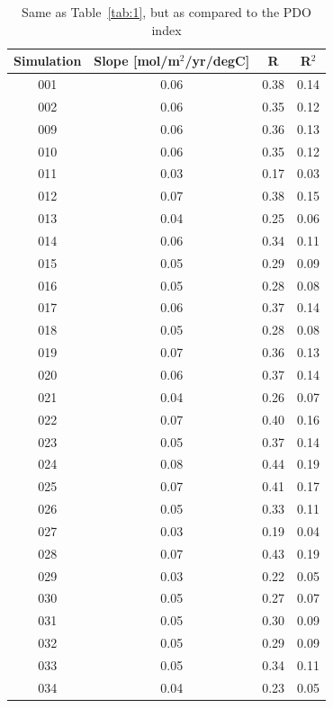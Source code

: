 \documentclass[12pt]{article}
\begin{document}
\begin{table}[!h]
\centering
\caption{Same as Table~\ref{tab:1}, but as compared to the PDO index}
\begin{tabular}{c | c c c}
	\toprule
	\textbf{Simulation} &  \textbf{Slope} [mol/m$^{2}$/yr/degC] &  \textbf{R} &  \textbf{R$^{2}$} \\
	\midrule
	001 &   0.06 &     0.38 &       0.14 \\
	002 &   0.06 &     0.35 &       0.12 \\
	009 &   0.06 &     0.36 &       0.13 \\
	010 &   0.06 &     0.35 &       0.12 \\
	011 &   0.03 &     0.17 &       0.03 \\
	012 &   0.07 &     0.38 &       0.15 \\
	013 &   0.04 &     0.25 &       0.06 \\
	014 &   0.06 &     0.34 &       0.11 \\
	015 &   0.05 &     0.29 &       0.09 \\
	016 &   0.05 &     0.28 &       0.08 \\
	017 &   0.06 &     0.37 &       0.14 \\
	018 &   0.05 &     0.28 &       0.08 \\
	019 &   0.07 &     0.36 &       0.13 \\
	020 &   0.06 &     0.37 &       0.14 \\
	021 &   0.04 &     0.26 &       0.07 \\
	022 &   0.07 &     0.40 &       0.16 \\
	023 &   0.05 &     0.37 &       0.14 \\
	024 &   0.08 &     0.44 &       0.19 \\
	025 &   0.07 &     0.41 &       0.17 \\
	026 &   0.05 &     0.33 &       0.11 \\
	027 &   0.03 &     0.19 &       0.04 \\
	028 &   0.07 &     0.43 &       0.19 \\
	029 &   0.03 &     0.22 &       0.05 \\
	030 &   0.05 &     0.27 &       0.07 \\
	031 &   0.05 &     0.30 &       0.09 \\
	032 &   0.05 &     0.29 &       0.09 \\
	033 &   0.05 &     0.34 &       0.11 \\
	034 &   0.04 &     0.23 &       0.05 \\

\end{tabular}
\end{table}
\end{document}
